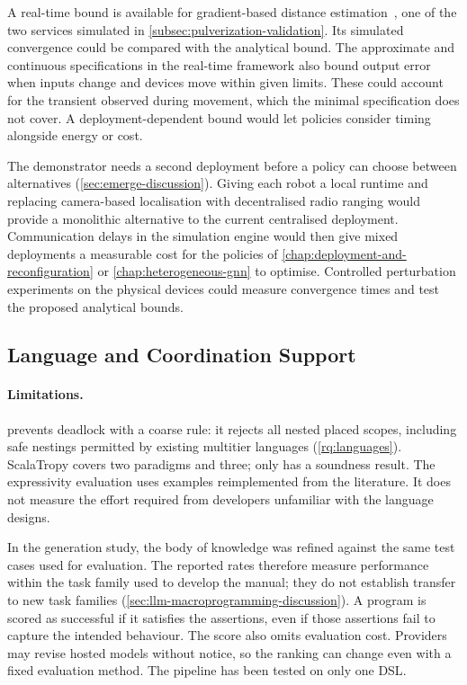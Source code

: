 A real-time bound is available for gradient-based distance estimation~\cite{DBLP:conf/rtss/AudritoDVB18},
one of the two services simulated in \cref{subsec:pulverization-validation}.
Its simulated convergence could be compared with the analytical bound.
The approximate and continuous specifications in the real-time framework also bound output error
when inputs change and devices move within given limits.
These could account for the transient observed during movement, which the minimal specification does not cover.
A deployment-dependent bound would let policies consider timing alongside energy or cost.

The demonstrator needs a second deployment before a policy can choose between alternatives (\cref{sec:emerge-discussion}).
Giving each robot a local runtime and replacing camera-based localisation with decentralised radio ranging
would provide a monolithic alternative to the current centralised deployment.
Communication delays in the simulation engine would then give mixed deployments a measurable cost
for the policies of \cref{chap:deployment-and-reconfiguration} or \cref{chap:heterogeneous-gnn} to optimise.
Controlled perturbation experiments on the physical devices could measure convergence times
and test the proposed analytical bounds.

\subsection{Language and Coordination Support}
\label{subsec:limits-languages}

\paragraph{Limitations.}
\camil prevents deadlock with a coarse rule: it rejects all nested placed scopes,
including safe nestings permitted by existing multitier languages (\cref{rq:languages}).
ScalaTropy covers two paradigms and \camil three;
only \camil has a soundness result.
The expressivity evaluation uses examples reimplemented from the literature.
It does not measure the effort required from developers unfamiliar with the language designs.

In the generation study, the body of knowledge was refined against the same test cases used for evaluation.
The reported rates therefore measure performance within the task family used to develop the manual;
they do not establish transfer to new task families (\cref{sec:llm-macroprogramming-discussion}).
A program is scored as successful if it satisfies the assertions,
even if those assertions fail to capture the intended behaviour.
The score also omits evaluation cost.
Providers may revise hosted models without notice, so the ranking can change even with a fixed evaluation method.
The pipeline has been tested on only one \ac{DSL}.

